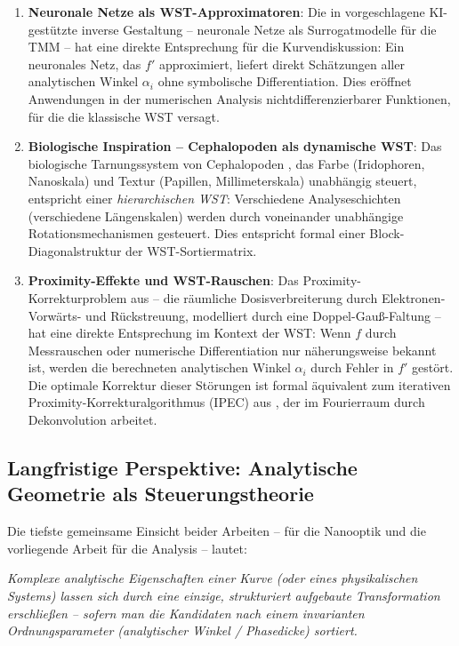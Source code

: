 ﻿\documentclass[12pt, a4paper]{article}
\theoremstyle{definition}
\begin{document}
\begin{enumerate}[leftmargin=*, label=\textbf{F\arabic*.}]
		\item \textbf{Neuronale Netze als WST-Approximatoren}: Die in \cite{oqtum}
		vorgeschlagene KI-gestützte inverse Gestaltung -- neuronale Netze
		als Surrogatmodelle für die TMM -- hat eine direkte Entsprechung für
		die Kurvendiskussion: Ein neuronales Netz, das $f'$ approximiert,
		liefert direkt Schätzungen aller analytischen Winkel $\alpha_i$ ohne
		symbolische Differentiation. Dies eröffnet Anwendungen in der
		numerischen Analysis nichtdifferenzierbarer Funktionen, für die die
		klassische WST versagt.
		
		\item \textbf{Biologische Inspiration -- Cephalopoden als dynamische WST}:
		Das biologische Tarnungssystem von Cephalopoden \cite{oqtum}, das Farbe
		(Iridophoren, Nanoskala) und Textur (Papillen, Millimeterskala) unabhängig
		steuert, entspricht einer \emph{hierarchischen WST}: Verschiedene
		Analyseschichten (verschiedene Längenskalen) werden durch voneinander
		unabhängige Rotationsmechanismen gesteuert. Dies entspricht formal einer
		Block-Diagonalstruktur der WST-Sortiermatrix.
		
		\item \textbf{Proximity-Effekte und WST-Rauschen}: Das Proximity-Korrekturproblem
		aus \cite{oqtum} -- die räumliche Dosisverbreiterung durch Elektronen-Vorwärts-
		und Rückstreuung, modelliert durch eine Doppel-Gauß-Faltung -- hat eine
		direkte Entsprechung im Kontext der WST: Wenn $f$ durch Messrauschen oder
		numerische Differentiation nur näherungsweise bekannt ist, werden die
		berechneten analytischen Winkel $\alpha_i$ durch Fehler in $f'$
		gestört. Die optimale Korrektur dieser Störungen ist formal äquivalent
		zum iterativen Proximity-Korrekturalgorithmus (IPEC) aus \cite{oqtum},
		der im Fourierraum durch Dekonvolution arbeitet.
	\end{enumerate}
	
	\subsection{Langfristige Perspektive: Analytische Geometrie als Steuerungstheorie}
	
	Die tiefste gemeinsame Einsicht beider Arbeiten -- \cite{oqtum} für die Nanooptik
	und die vorliegende Arbeit für die Analysis -- lautet:
	
	\begin{center}
		\emph{Komplexe analytische Eigenschaften einer Kurve (oder eines physikalischen
			Systems) lassen sich durch eine einzige, strukturiert aufgebaute Transformation
			erschließen -- sofern man die Kandidaten nach einem invarianten Ordnungsparameter
			(analytischer Winkel / Phasedicke) sortiert.}
	\end{center}
	
\end{document}
